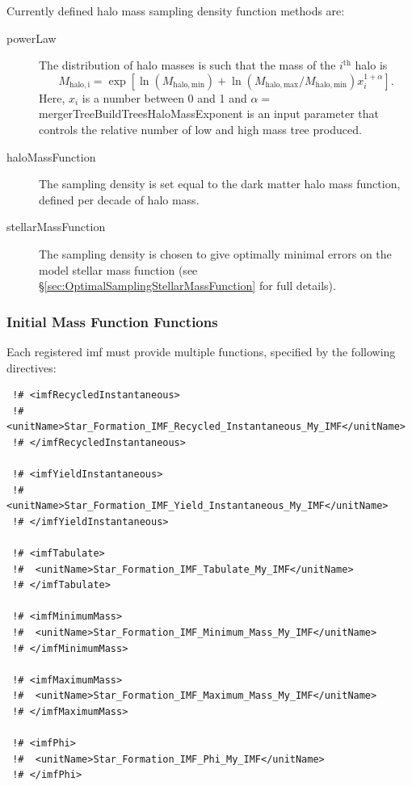 Currently defined halo mass sampling density function methods are:
\begin{description}
 \item [{\normalfont \ttfamily powerLaw}] The distribution of halo masses is such that the mass of the $i^\mathrm{th}$ halo is
\begin{equation}
 M_\mathrm{halo,i} = \exp\left[ \ln(M_\mathrm{halo,min}) + \ln\left({M_\mathrm{halo,max}/M_\mathrm{halo,min}}\right) x_i^{1+\alpha} \right].
\end{equation}
Here, $x_i$ is a number between 0 and 1 and $\alpha=${\normalfont \ttfamily mergerTreeBuildTreesHaloMassExponent} is an input parameter that controls the relative number of low and high mass tree produced. 
\item [{\normalfont \ttfamily haloMassFunction}] The sampling density is set equal to the dark matter halo mass function, defined per decade of halo mass.
\item [{\normalfont \ttfamily stellarMassFunction}] The sampling density is chosen to give optimally minimal errors on the model stellar mass function (see \S\ref{sec:OptimalSamplingStellarMassFunction} for full details).
\end{description}

\subsubsection{Initial Mass Function Functions}\label{sec:IMF_functions}

Each registered \gls{imf} must provide multiple functions, specified by the following directives:
\begin{verbatim}
 !# <imfRecycledInstantaneous>
 !#  <unitName>Star_Formation_IMF_Recycled_Instantaneous_My_IMF</unitName>
 !# </imfRecycledInstantaneous>

 !# <imfYieldInstantaneous>
 !#  <unitName>Star_Formation_IMF_Yield_Instantaneous_My_IMF</unitName>
 !# </imfYieldInstantaneous>

 !# <imfTabulate>
 !#  <unitName>Star_Formation_IMF_Tabulate_My_IMF</unitName>
 !# </imfTabulate>

 !# <imfMinimumMass>
 !#  <unitName>Star_Formation_IMF_Minimum_Mass_My_IMF</unitName>
 !# </imfMinimumMass>

 !# <imfMaximumMass>
 !#  <unitName>Star_Formation_IMF_Maximum_Mass_My_IMF</unitName>
 !# </imfMaximumMass>

 !# <imfPhi>
 !#  <unitName>Star_Formation_IMF_Phi_My_IMF</unitName>
 !# </imfPhi>
\end{verbatim}

